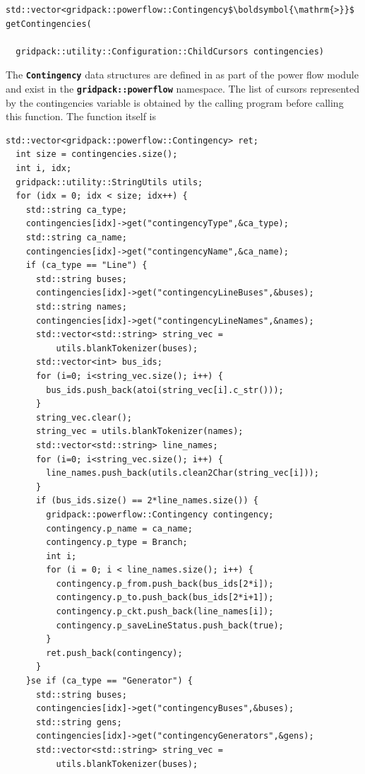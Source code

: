 \documentclass[12pt]{report} %
\begin{document}
{
\color{red}
\begin{Verbatim}[fontseries=b]
std::vector<gridpack::powerflow::Contingency$\boldsymbol{\mathrm{>}}$ getContingencies(

  gridpack::utility::Configuration::ChildCursors contingencies)
\end{Verbatim}
}

The \texttt{\textbf{Contingency}} data structures are defined in as part of the power flow module and exist in the \texttt{\textbf{gridpack::powerflow}} namespace. The list of cursors represented by the contingencies variable is obtained by the calling program before calling this function. The function itself is

{
\color{red}
\begin{Verbatim}[fontseries=b]
  std::vector<gridpack::powerflow::Contingency> ret;
  int size = contingencies.size();
  int i, idx;
  gridpack::utility::StringUtils utils;
  for (idx = 0; idx < size; idx++) {
    std::string ca_type;
    contingencies[idx]->get("contingencyType",&ca_type);
    std::string ca_name;
    contingencies[idx]->get("contingencyName",&ca_name);
    if (ca_type == "Line") {
      std::string buses;
      contingencies[idx]->get("contingencyLineBuses",&buses);
      std::string names;
      contingencies[idx]->get("contingencyLineNames",&names);
      std::vector<std::string> string_vec = 
          utils.blankTokenizer(buses);
      std::vector<int> bus_ids;
      for (i=0; i<string_vec.size(); i++) {
        bus_ids.push_back(atoi(string_vec[i].c_str()));
      }
      string_vec.clear();
      string_vec = utils.blankTokenizer(names);
      std::vector<std::string> line_names;
      for (i=0; i<string_vec.size(); i++) {
        line_names.push_back(utils.clean2Char(string_vec[i]));
      }
      if (bus_ids.size() == 2*line_names.size()) {
        gridpack::powerflow::Contingency contingency;
        contingency.p_name = ca_name;
        contingency.p_type = Branch;
        int i;
        for (i = 0; i < line_names.size(); i++) {
          contingency.p_from.push_back(bus_ids[2*i]);
          contingency.p_to.push_back(bus_ids[2*i+1]);
          contingency.p_ckt.push_back(line_names[i]);
          contingency.p_saveLineStatus.push_back(true);
        }
        ret.push_back(contingency);
      }
    }se if (ca_type == "Generator") {
      std::string buses;
      contingencies[idx]->get("contingencyBuses",&buses);
      std::string gens;
      contingencies[idx]->get("contingencyGenerators",&gens);
      std::vector<std::string> string_vec =
          utils.blankTokenizer(buses);

\end{Verbatim}}
\end{document}
